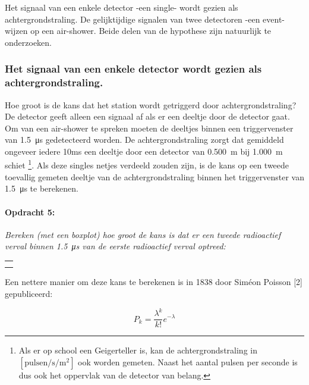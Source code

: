 Het signaal van een enkele detector -een single- wordt gezien als
achtergrondstraling. De gelijktijdige signalen van twee detectoren
-een event- wijzen op een air-shower. Beide delen van de hypothese
zijn natuurlijk te onderzoeken.


\subsubsection{Het signaal van een enkele detector wordt gezien als achtergrondstraling.}

Hoe groot is de kans dat het station wordt getriggerd door achtergrondstraling?
De detector geeft alleen een signaal af als er een deeltje door de
detector gaat. Om van een air-shower te spreken moeten de deeltjes
binnen een triggervenster van \SI{1.5}{\micro\second} gedetecteerd
worden. De achtergrondstraling zorgt dat gemiddeld ongeveer iedere
10ms een deeltje door een detector van \SI{0.500}{\meter} bij \SI{1.000}{\meter}
schiet%
\footnote{Als er op school een Geigerteller is, kan de achtergrondstraling in
$\mathrm{\left[pulsen/s/m^{2}\right]}$ ook worden gemeten. Naast
het aantal pulsen per seconde is dus ook het oppervlak van de detector
van belang.%
}. Als deze singles netjes verdeeld zouden zijn, is de kans op een
tweede toevallig gemeten deeltje van de achtergrondstraling binnen
het triggervenster van \SI{1.5}{\micro\second} te berekenen.

\begin{minipage}[t]{1\columnwidth}%

\paragraph{Opdracht 5:}

\textit{Bereken (met een boxplot) hoe groot de kans is dat er een
tweede radioactief verval binnen \SI{1.5}{\micro\second} van de eerste
radioactief verval optreed:}

\begin{tabular}{>{\raggedright}p{16.6cm}}
\tabularnewline
\hline 
\tabularnewline
\hline 
\tabularnewline
\hline 
\tabularnewline
\hline 
\end{tabular}%
\end{minipage}

\bigskip{}


Een nettere manier om deze kans te berekenen is in 1838 door Siméon
Poisson {[}2{]} gepubliceerd:

\begin{equation}
P_{k}=\frac{\lambda^{k}}{k!}e^{-\lambda}
\end{equation}


